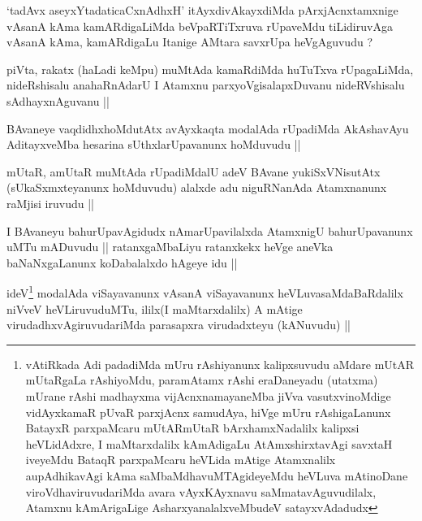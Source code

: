 
\begin{artha}
`tadAvx aseyxYtadaticaCxnAdhxH' itAyxdivAkayxdiMda pArxjAcnxtamxnige
  vAsanA kAma kamARdigaLiMda beVpaRTiTxruva rUpaveMdu tiLidiruvAga
  vAsanA kAma, kamARdigaLu Itanige AMtara savxrUpa heVgAguvudu ?
\end{artha}


\begin{artha}
piVta, rakatx (haLadi keMpu) muMtAda kamaRdiMda huTuTxva rUpagaLiMda,
nideRshisalu anahaRnAdarU I Atamxnu parxyoVgisalapxDuvanu
nideRVshisalu sAdhayxnAguvanu ||
\end{artha}

\begin{artha}
BAvaneye vaqdidhxhoMdutAtx avAyxkaqta modalAda rUpadiMda AkAshavAyu
AditayxveMba hesarina sUthxlarUpavanunx hoMduvudu ||
\end{artha}


\begin{artha}
mUtaR, amUtaR muMtAda rUpadiMdalU adeV BAvane yukiSxVNisutAtx
(sUkaSxmxteyanunx hoMduvudu) alalxde adu niguRNanAda Atamxnanunx
raMjisi iruvudu ||
\end{artha}

\begin{artha}
I BAvaneyu bahurUpavAgidudx nAmarUpavilalxda AtamxnigU bahurUpavanunx
uMTu mADuvudu || ratanxgaMbaLiyu ratanxkekx heVge aneVka
baNaNxgaLanunx koDabalalxdo hAgeye idu ||
\end{artha}


\begin{artha}
ideV\footnote{vAtiRkada Adi padadiMda mUru rAshiyanunx kalipxsuvudu
  aMdare mUtAR mUtaRgaLa rAshiyoMdu, paramAtamx rAshi eraDaneyadu
  (utatxma) mUrane rAshi madhayxma vijAcnxnamayaneMba jiVva
  vasutxvinoMdige vidAyxkamaR pUvaR parxjAcnx samudAya, hiVge mUru
  rAshigaLanunx BatayxR parxpaMcaru mUtARmUtaR bArxhamxNadalilx
  kalipxsi heVLidAdxre, I maMtarxdalilx kAmAdigaLu AtAmxshirxtavAgi
  savxtaH iveyeMdu BataqR parxpaMcaru heVLida mAtige Atamxnalilx
  aupAdhikavAgi kAma saMbaMdhavuMTAgideyeMdu heVLuva mAtinoDane
  viroVdhaviruvudariMda avara vAyxKAyxnavu saMmatavAguvudilalx,
  Atamxnu kAmArigaLige AsharxyanalalxveMbudeV satayxvAdadudx} modalAda viSayavanunx vAsanA viSayavanunx
heVLuvasaMdaBaRdalilx niVveV heVLiruvuduMTu, ililx\footnotemark (I
maMtarxdalilx) A mAtige virudadhxvAgiruvudariMda parasapxra
virudadxteyu (kANuvudu) ||
\end{artha}

